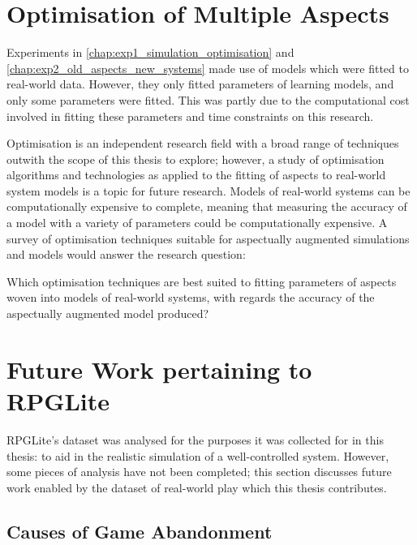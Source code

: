 \section{Optimisation of Multiple
Aspects}\label{many_aspectual_models_to_optimise}

Experiments in \cref{chap:exp1_simulation_optimisation} and
\cref{chap:exp2_old_aspects_new_systems} made use of models which were fitted to
real-world data. However, they only fitted parameters of learning models, and
only some parameters were fitted. This was partly due to the
computational cost involved in fitting these parameters and time constraints on
this research.

Optimisation is an independent research field with a broad range
of techniques outwith the scope of this thesis to explore; however, a study of
optimisation algorithms and technologies as applied to the fitting of aspects to
real-world system models is a topic for future research. Models of real-world
systems can be computationally expensive to complete, meaning that measuring the
accuracy of a model with a variety of parameters could be computationally
expensive. A survey of optimisation techniques suitable for aspectually
augmented simulations and models would answer the research question:

\begin{researchquestion}
    Which optimisation techniques are best suited to fitting parameters of
    aspects woven into models of real-world systems, with regards the
    accuracy of the aspectually augmented model produced?
\end{researchquestion}



\section{Future Work pertaining to RPGLite}\label{sec:future_work_rpglite}
RPGLite's dataset was analysed for the purposes it was collected for in this
thesis: to aid in the realistic simulation of a well-controlled \sociotechnical
system. However, some pieces of analysis have not been completed; this section
discusses future work enabled by the dataset of real-world play which this
thesis contributes.

\subsection{Causes of Game Abandonment}\label{future_work_rpglite_abandonment_reasons}

